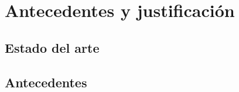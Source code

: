 \section{Antecedentes y justificación}
\subsection{Estado del arte}
\subsection{Antecedentes}
\pagebreak